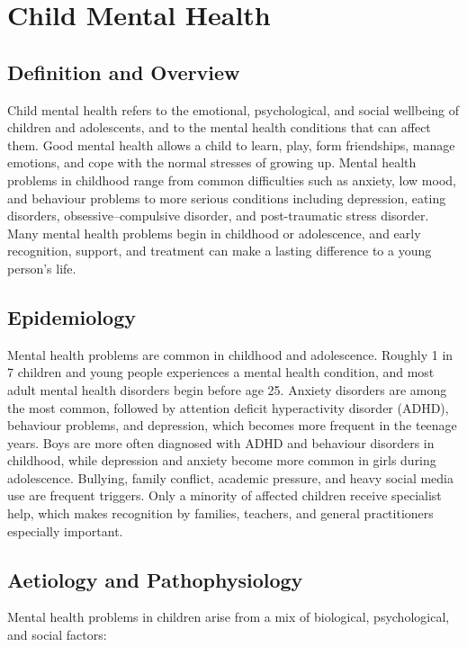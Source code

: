 \chapter{Child Mental Health}

\section*{Definition and Overview}
Child mental health refers to the emotional, psychological, and social wellbeing of children and adolescents, and to the mental health conditions that can affect them. Good mental health allows a child to learn, play, form friendships, manage emotions, and cope with the normal stresses of growing up. Mental health problems in childhood range from common difficulties such as anxiety, low mood, and behaviour problems to more serious conditions including depression, eating disorders, obsessive--compulsive disorder, and post-traumatic stress disorder. Many mental health problems begin in childhood or adolescence, and early recognition, support, and treatment can make a lasting difference to a young person's life.

\section*{Epidemiology}
Mental health problems are common in childhood and adolescence. Roughly 1 in 7 children and young people experiences a mental health condition, and most adult mental health disorders begin before age 25. Anxiety disorders are among the most common, followed by attention deficit hyperactivity disorder (ADHD), behaviour problems, and depression, which becomes more frequent in the teenage years. Boys are more often diagnosed with ADHD and behaviour disorders in childhood, while depression and anxiety become more common in girls during adolescence. Bullying, family conflict, academic pressure, and heavy social media use are frequent triggers. Only a minority of affected children receive specialist help, which makes recognition by families, teachers, and general practitioners especially important.

\section*{Aetiology and Pathophysiology}
Mental health problems in children arise from a mix of biological, psychological, and social factors:

